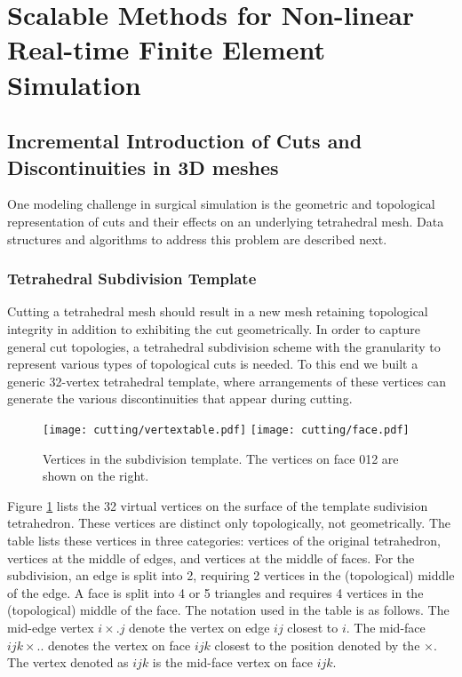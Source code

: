 
% 
\clearpage

\section{Scalable Methods for Non-linear Real-time Finite Element Simulation}\label{sec:fem_simulation}

\subsection{Incremental Introduction of Cuts and Discontinuities in 3D meshes}\label{ssec:discontinuous_fem}
One modeling challenge in surgical simulation is the geometric and topological representation of cuts and their effects on an underlying tetrahedral mesh. Data structures and algorithms to address this problem are described next. 

\subsubsection{Tetrahedral Subdivision Template}

Cutting a tetrahedral mesh should result in a new mesh retaining topological integrity in addition to exhibiting the cut geometrically. In order to capture general cut topologies, a tetrahedral subdivision scheme with the granularity to represent various types of topological cuts is needed. To this end we built a generic 32-vertex tetrahedral template, where arrangements of these vertices can generate the various discontinuities that appear during cutting. 

\begin{figure}
	\texttt{[image: cutting/vertextable.pdf]}
	\texttt{[image: cutting/face.pdf]}
	\caption{Vertices in the subdivision template. The vertices on face 012 are shown on the right.}
	\label{fig:vertices}
\end{figure}

Figure \ref{fig:vertices} lists the 32 virtual vertices on the surface of the template sudivision tetrahedron. These vertices are distinct only topologically, not geometrically. The table lists these vertices in three categories: vertices of the original tetrahedron, vertices at the middle of edges, and vertices at the middle of faces. For the subdivision, an edge is split into 2, requiring 2 vertices in the (topological) middle of the edge. A face is split into 4 or 5 triangles and requires 4 vertices in the (topological) middle of the face. The notation used in the table is as follows. The mid-edge vertex $i\times .j$ denote the vertex on edge $ij$ closest to $i$. The mid-face $ijk\times ..$ denotes the vertex on face $ijk$ closest to the position denoted by the $\times$. The vertex denoted as $ijk$ is the mid-face vertex on face $ijk$. 


